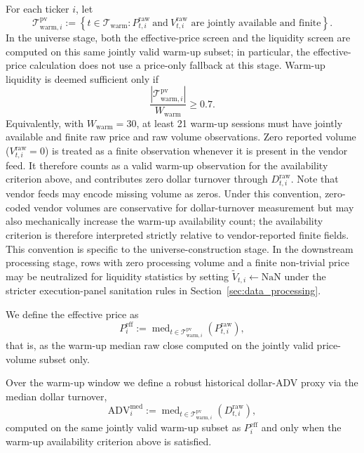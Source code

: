 \documentclass[11pt,a4paper]{article}
\begin{document}
For each ticker $i$, let
\[
\mathcal{T}^{\mathrm{pv}}_{\mathrm{warm},i}
:=
\left\{
t \in \mathcal{T}_{\mathrm{warm}} :
P^{\mathrm{raw}}_{t,i}\ \text{and}\ V^{\mathrm{raw}}_{t,i}
\text{ are jointly available and finite}
\right\}.
\]
In the universe stage, both the effective-price screen and the liquidity screen
are computed on this same jointly valid warm-up subset; in particular, the
effective-price calculation does not use a price-only fallback at this stage.
Warm-up liquidity is deemed sufficient only if
\[
\frac{\left|\mathcal{T}^{\mathrm{pv}}_{\mathrm{warm},i}\right|}
{W_{\mathrm{warm}}}
\ge 0.7.
\]
Equivalently, with $W_{\mathrm{warm}}=30$, at least 21 warm-up sessions must
have jointly available and finite raw price and raw volume observations.
Zero reported volume ($V^{\mathrm{raw}}_{t,i}=0$) is treated as a finite
observation whenever it is present in the vendor feed. It therefore counts as a
valid warm-up observation for the availability criterion above, and contributes
zero dollar turnover through $D^{\mathrm{raw}}_{t,i}$. Note that vendor feeds may encode missing volume as zeros. Under this convention, zero-coded vendor volumes are conservative for dollar-turnover measurement but may also mechanically increase the warm-up availability count; the availability criterion is therefore interpreted strictly relative to vendor-reported finite fields. This convention is specific to the universe-construction stage. In the downstream
processing stage, rows with zero processing volume and a finite non-trivial price
may be neutralized for liquidity statistics by setting
\(\widetilde V_{t,i}\leftarrow \mathrm{NaN}\) under the stricter execution-panel
sanitation rules in Section~\ref{sec:data_processing}.

We define the effective price as
\[
P_i^{\mathrm{eff}} :=
\operatorname{med}_{t\in\mathcal{T}^{\mathrm{pv}}_{\mathrm{warm},i}}
\!\left(P^{\mathrm{raw}}_{t,i}\right),
\]
that is, as the warm-up median raw close computed on the jointly valid
price-volume subset only.

Over the warm-up window we define a robust historical dollar-ADV proxy via the
median dollar turnover,
\[
\mathrm{ADV}^{\mathrm{med}}_i :=
\operatorname{med}_{t\in\mathcal{T}^{\mathrm{pv}}_{\mathrm{warm},i}}
\!\left(D^{\mathrm{raw}}_{t,i}\right),
\]
computed on the same jointly valid warm-up subset as $P_i^{\mathrm{eff}}$ and
only when the warm-up availability criterion above is satisfied.
\end{document}
